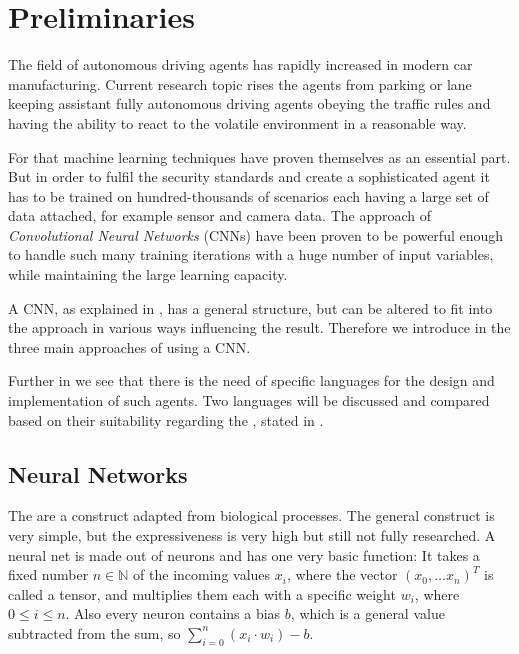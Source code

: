 \chapter{Preliminaries}

The field of autonomous driving agents has rapidly increased in modern car manufacturing. Current research topic rises the agents from parking or lane keeping assistant fully autonomous driving agents obeying the traffic rules and having the ability to react to the volatile environment in a reasonable way.

For that machine learning techniques have proven themselves as an essential part. But in order to fulfil the security standards and create a sophisticated agent it has to be trained on hundred-thousands of scenarios each having a large set of data attached, for example sensor and camera data.
The approach of \textit{Convolutional Neural Networks} (CNNs) have been proven to be powerful enough to handle such many training iterations with a huge number of input variables, while maintaining the large learning capacity. \cite{krizhevsky2012imagenet}

A CNN, as explained in , has a general structure, but can be altered to fit into the approach in various ways influencing the result. Therefore we introduce in  the three main approaches of using a CNN.

Further in  we see that there is the need of specific languages for the design and implementation of such agents. Two languages will be discussed and compared based on their suitability regarding the \alexnet, stated in  .

\section{Neural Networks}\label{sec: NN}

The \nns are a construct adapted from biological processes. The general construct is very simple, but the expressiveness is very high but still not fully researched.
A neural net is made out of neurons and has one very basic function:
It takes a fixed number $n \in \mathbb{N}$ of the incoming values $x_i$, where the vector $(x_0,\dots x_n)^T$ is called a tensor, and multiplies them each with a specific weight $w_i$, where $0 \le i \le n$.
Also every neuron contains a bias $b$, which is a general value subtracted from the sum, so $\sum_{i=0}^{n} (x_i \cdot w_i) -b$. 

